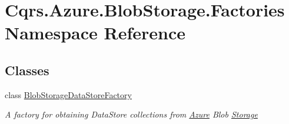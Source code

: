 \hypertarget{namespaceCqrs_1_1Azure_1_1BlobStorage_1_1Factories}{}\section{Cqrs.\+Azure.\+Blob\+Storage.\+Factories Namespace Reference}
\label{namespaceCqrs_1_1Azure_1_1BlobStorage_1_1Factories}
\subsection*{Classes}
\begin{DoxyCompactItemize}
\item 
class \hyperlink{classCqrs_1_1Azure_1_1BlobStorage_1_1Factories_1_1BlobStorageDataStoreFactory}{Blob\+Storage\+Data\+Store\+Factory}
\begin{DoxyCompactList}\small\item\em A factory for obtaining Data\+Store collections from \hyperlink{namespaceCqrs_1_1Azure}{Azure} Blob \hyperlink{namespaceCqrs_1_1Azure_1_1Storage}{Storage} \end{DoxyCompactList}\end{DoxyCompactItemize}
